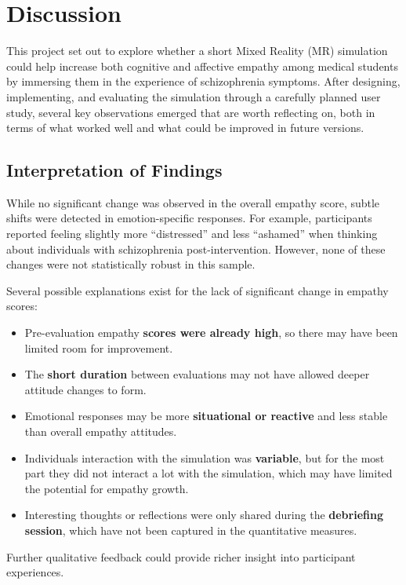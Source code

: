 \chapter{Discussion}
\label{ch:discussion}

This project set out to explore whether a short Mixed Reality (MR) simulation could help increase both cognitive and affective empathy among medical students by immersing them in the experience of schizophrenia symptoms. After designing, implementing, and evaluating the simulation through a carefully planned user study, several key observations emerged that are worth reflecting on, both in terms of what worked well and what could be improved in future versions.

\section{Interpretation of Findings}

While no significant change was observed in the overall empathy score, subtle shifts were detected in emotion-specific responses. For example, participants reported feeling slightly more “distressed” and less “ashamed” when thinking about individuals with schizophrenia post-intervention. However, none of these changes were not statistically robust in this sample.

Several possible explanations exist for the lack of significant change in empathy scores:
\begin{itemize}
  \item Pre-evaluation empathy \textbf{scores were already high}, so there may have been limited room for improvement.
  \item The \textbf{short duration} between evaluations may not have allowed deeper attitude changes to form.
  \item Emotional responses may be more \textbf{situational or reactive} and less stable than overall empathy attitudes.
  \item Individuals interaction with the simulation was \textbf{variable}, but for the most part they did not interact a lot with the simulation, which may have limited the potential for empathy growth.
  \item Interesting thoughts or reflections were only shared during the \textbf{debriefing session}, which have not been captured in the quantitative measures.
\end{itemize}

Further qualitative feedback could provide richer insight into participant experiences.


